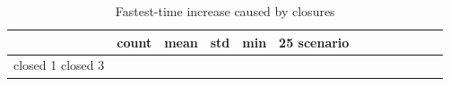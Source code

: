 \begin{table}
\caption{Fastest-time increase caused by closures}
\label{tab:T5b_closure_delay}
\begin{tabular}{lrrrrrrrr}
\toprule
 & count & mean & std & min & 25%
scenario &  &  &  &  &  &  &  &  \\
\midrule
closed 1%
closed 3%
\bottomrule
\end{tabular}
\end{table}
